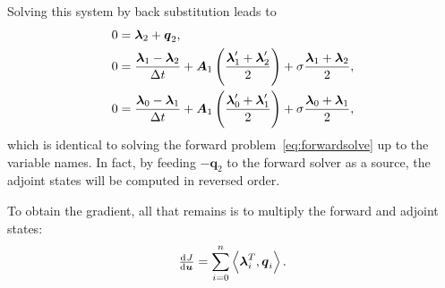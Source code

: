 \documentclass[a4paper]{article}
\renewcommand{\vec}{\boldsymbol}
\begin{document}
Solving this system by back substitution leads to
\begin{equation}
  \begin{aligned}
    0 &= \vec{\lambda}_{2} + \vec{q}_{2},
    \\
    0 &= \frac{\vec{\lambda}_{1} - \vec{\lambda}_{2}}{\Delta t}
    + \vec{A}_1\del{\frac{\vec{\lambda}_{1}^\prime
        + \vec{\lambda}_{2}^\prime}{2}}
    + \sigma \frac{\vec{\lambda}_{1}+\vec{\lambda}_{2}}{2},
    \\
    0 &= \frac{\vec{\lambda}_{0} - \vec{\lambda}_{1}}{\Delta t}
    + \vec{A}_1\del{\frac{\vec{\lambda}_{0}^\prime +
    \vec{\lambda}_{1}^\prime}{2}}
    + \sigma \frac{\vec{\lambda}_{0}+\vec{\lambda}_{1}}{2},
  \end{aligned}
  \label{eq:adjointsolve}
\end{equation}
which is identical to solving the forward
problem~\eqref{eq:forwardsolve} up to the variable names. In fact, by
feeding $-\vec{q}_{2}$ to the forward solver as a source, the adjoint
states will be computed in reversed order.

To obtain the gradient, all that remains is to multiply the forward
and adjoint states:
\begin{equation}
  \od{J}{\vec{u}} = \sum_{i = 0}^{n} \left<\vec{\lambda}_{i}^T,
  \vec{q}_{i}\right>.
\end{equation}
\end{document}
